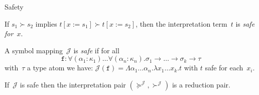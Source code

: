 \documentclass[10pt,presentation,color=names]{beamer}
\newcommand{\arrtype}{\rightarrow}
\newcommand{\subst}[2]{#1:=#2}
\newcommand{\abs}[2]{\lambda #1.#2}
\newcommand{\tabs}[2]{\Lambda #1.#2}
\newcommand{\Termmap}{\mathcal{J}}
\newcommand{\succinterpret}{\succ^{\Termmap}}
\newcommand{\succeqinterpret}{\succeq^{\Termmap}}
\begin{document}
\begin{frame}{Safety}
  \begin{definition}
    If $s_1 \succ s_2$ implies $t[\subst{x}{s_1}] \succ
    t[\subst{x}{s_2}]$, then the interpretation term~$t$ is \emph{safe
      for~$x$}.
  \end{definition}
  \pause
  \begin{definition}
    A symbol mapping~$\Termmap$ is \emph{safe} if for all
    \[
    \mathtt{f} : \forall (\alpha_1 : \kappa_1) \ldots \forall
    (\alpha_n : \kappa_n) . \sigma_1 \arrtype \ldots \arrtype \sigma_k
    \arrtype \tau
    \]
    with~$\tau$ a type atom we have: $\Termmap(\mathtt{f}) =
    \tabs{\alpha_1 \dots \alpha_n}{\abs{x_1 \dots x_k}{t}}$ with $t$
    safe for each~$x_i$.
  \end{definition}

  \pause

  \begin{theorem}
    If~$\Termmap$ is safe then the interpretation pair
    $(\succeqinterpret,\succinterpret)$ is a reduction pair.
  \end{theorem}
\end{frame}
\end{document}
